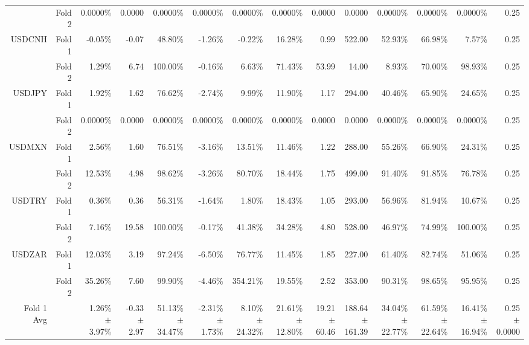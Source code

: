 \begin{table}[H]
{\begin{tabular}{rrrrrrrrrrrrrr}
 & Fold 2 & 0.0000\% & 0.0000 & 0.0000\% & 0.0000\% & 0.0000\% & 0.0000\% & 0.0000 & 0.0000 & 0.0000\% & 0.0000\% & 0.0000\% & 0.25 \\
USDCNH & Fold 1 & -0.05\% & -0.07 & 48.80\% & -1.26\% & -0.22\% & 16.28\% & 0.99 & 522.00 & 52.93\% & 66.98\% & 7.57\% & 0.25 \\
 & Fold 2 & 1.29\% & 6.74 & 100.00\% & -0.16\% & 6.63\% & 71.43\% & 53.99 & 14.00 & 8.93\% & 70.00\% & 98.93\% & 0.25 \\
USDJPY & Fold 1 & 1.92\% & 1.62 & 76.62\% & -2.74\% & 9.99\% & 11.90\% & 1.17 & 294.00 & 40.46\% & 65.90\% & 24.65\% & 0.25 \\
 & Fold 2 & 0.0000\% & 0.0000 & 0.0000\% & 0.0000\% & 0.0000\% & 0.0000\% & 0.0000 & 0.0000 & 0.0000\% & 0.0000\% & 0.0000\% & 0.25 \\
USDMXN & Fold 1 & 2.56\% & 1.60 & 76.51\% & -3.16\% & 13.51\% & 11.46\% & 1.22 & 288.00 & 55.26\% & 66.90\% & 24.31\% & 0.25 \\
 & Fold 2 & 12.53\% & 4.98 & 98.62\% & -3.26\% & 80.70\% & 18.44\% & 1.75 & 499.00 & 91.40\% & 91.85\% & 76.78\% & 0.25 \\
USDTRY & Fold 1 & 0.36\% & 0.36 & 56.31\% & -1.64\% & 1.80\% & 18.43\% & 1.05 & 293.00 & 56.96\% & 81.94\% & 10.67\% & 0.25 \\
 & Fold 2 & 7.16\% & 19.58 & 100.00\% & -0.17\% & 41.38\% & 34.28\% & 4.80 & 528.00 & 46.97\% & 74.99\% & 100.00\% & 0.25 \\
USDZAR & Fold 1 & 12.03\% & 3.19 & 97.24\% & -6.50\% & 76.77\% & 11.45\% & 1.85 & 227.00 & 61.40\% & 82.74\% & 51.06\% & 0.25 \\
 & Fold 2 & 35.26\% & 7.60 & 99.90\% & -4.46\% & 354.21\% & 19.55\% & 2.52 & 353.00 & 90.31\% & 98.65\% & 95.95\% & 0.25 \\
\midrule
\midrule
Fold 1 Avg &  & \shortstack{1.26\% \\ $\pm$ 3.97\%} & \shortstack{-0.33 \\ $\pm$ 2.97} & \shortstack{51.13\% \\ $\pm$ 34.47\%} & \shortstack{-2.31\% \\ $\pm$ 1.73\%} & \shortstack{8.10\% \\ $\pm$ 24.32\%} & \shortstack{21.61\% \\ $\pm$ 12.80\%} & \shortstack{19.21 \\ $\pm$ 60.46} & \shortstack{188.64 \\ $\pm$ 161.39} & \shortstack{34.04\% \\ $\pm$ 22.77\%} & \shortstack{61.59\% \\ $\pm$ 22.64\%} & \shortstack{16.41\% \\ $\pm$ 16.94\%} & \shortstack{0.25 \\ $\pm$ 0.0000} \\

\end{tabular}}
\end{table}
